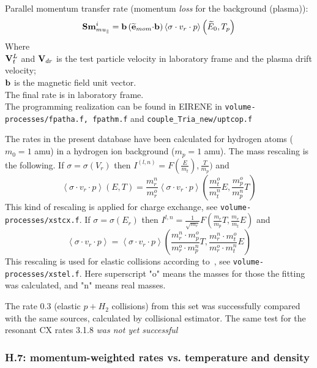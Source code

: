 \documentclass[12pt,dvipdfmx]{article}
\begin{document}
Parallel momentum transfer rate (momentum {\em loss} for the background (plasma)):
$$
{\bf Sm}^i_{mu_\parallel}= {\bf b} \left(\widetilde{{\bf e}}_{mom}{\bf\cdot}{\bf b}\right) \left<\sigma\cdot v_r\cdot p\right>
\left(\widetilde{E}_0 ,T_p\right)
$$
Where\\
${\bf V}^L_t$ and ${\bf V}_{dr}$ is the test particle velocity in laboratory frame and the plasma drift velocity;\\

${\bf b}$ is the magnetic field unit vector.\\
The final rate is in laboratory frame.\\
The programming realization can be found in EIRENE in {\tt volume-processes/fpatha.f, fpathm.f} and {\tt couple\_Tria\_new/uptcop.f}

The rates in the present database have been calculated for hydrogen atoms ($m_0=1$ amu) in a hydrogen ion background ($m_p=1$ amu). The mass rescaling is the following.
If $\sigma=\sigma(V_r)$ then $I^{(l,n)}=F\left(\frac{E}{m_t}\right),\frac{T}{m_p})$ and
$$\left<\sigma\cdot v_r\cdot p\right>(E,T)=\frac{m^n_r}{m^o_r}
\left<\sigma\cdot v_r\cdot p\right>(\frac{m^o_t}{m^n_t}E,\frac{m^o_p}{m^n_p}T)$$
This kind of rescaling is applied for charge exchange, see {\tt volume-processes/xstcx.f}.
If $\sigma=\sigma(E_r)$ then $I^{l,n}=\frac{1}{\sqrt{m_r}}F\left(\frac{m_r}{m_p}T, \frac{m_r}{m_t}E\right)$ and
$$\left<\sigma\cdot v_r\cdot p\right>=\left<\sigma\cdot v_r\cdot p\right>\left(\frac{m^n_r\cdot m^o_p}{m^o_r\cdot m^n_p}T,\frac{m^n_r\cdot m^o_t}{m^o_r\cdot m^n_t}E\right)$$
This rescaling is used for elastic collisions according to~\cite{kn:OakRidge}, see {\tt volume-processes/xstel.f}. Here superscript "o" means the masses for those the fitting was calculated, and "n" means real masses.

The rate 0.3 (elastic $p+H_2$ collisions) from this set was successfully compared with the same sources, calculated by collisional estimator. The same test for the resonant CX rates 3.1.8  {\em was not yet successful}
\subsubsection{H.7: momentum-weighted rates vs. temperature and density}\label{sec1.3.7}
\end{document}
